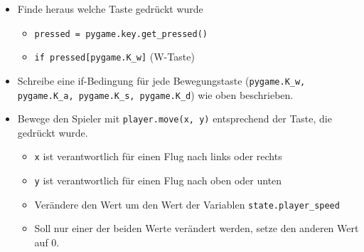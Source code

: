 \begin{itemize}
	\item Finde heraus welche Taste gedrückt wurde
	\begin{itemize}
		\item \texttt{pressed = pygame.key.get\_pressed()}
		\item \texttt{if pressed[pygame.K\_w]} (W-Taste)
	\end{itemize}
	\item Schreibe eine if-Bedingung für jede Bewegungstaste (\texttt{pygame.K\_w, pygame.K\_a, pygame.K\_s, pygame.K\_d}) wie oben beschrieben.
	\item Bewege den Spieler mit \texttt{player.move(x, y)} entsprechend der Taste, die gedrückt wurde.
	\begin{itemize}
		\item \texttt{x} ist verantwortlich für einen Flug nach links oder rechts
		\item \texttt{y} ist verantwortlich für einen Flug nach oben oder unten
		\item Verändere den Wert um den Wert der Variablen \texttt{state.player\_speed}
		\item Soll nur einer der beiden Werte verändert werden, setze den anderen Wert auf 0.
	\end{itemize}	 
\end{itemize}